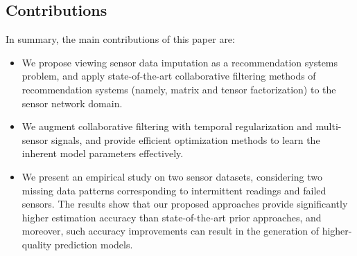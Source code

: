 
\subsection{Contributions}

In summary, the main contributions of this paper are:
\begin{itemize}
\item We propose viewing sensor data imputation as a recommendation systems problem, and apply state-of-the-art collaborative filtering methods of recommendation systems (namely, matrix and tensor factorization) to the sensor network domain.
\item We augment collaborative filtering with temporal regularization and multi-sensor signals, and provide efficient optimization methods to learn the inherent model parameters effectively.
\item We present an empirical study on two sensor datasets, considering two
missing data patterns corresponding to intermittent readings and failed
sensors. The results show that our proposed approaches provide
significantly higher estimation accuracy than state-of-the-art prior
approaches, and moreover, such accuracy improvements can result in the
generation of higher-quality prediction models.
\end{itemize}



